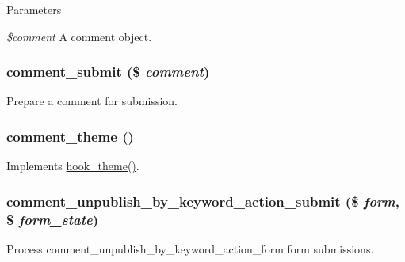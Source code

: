 \begin{DoxyParams}{Parameters}
\item[{\em \$comment}]A comment object. \end{DoxyParams}
\hypertarget{comment_8module_af9a31d3ab86177a7ac7999d049dc0b5f}{
\subsubsection[{comment\_\-submit}]{\setlength{\rightskip}{0pt plus 5cm}comment\_\-submit (\$ {\em comment})}}
\label{comment_8module_af9a31d3ab86177a7ac7999d049dc0b5f}
Prepare a comment for submission. \hypertarget{comment_8module_a55ab29f2d9bfd7b05965e42a9fde98b7}{
\subsubsection[{comment\_\-theme}]{\setlength{\rightskip}{0pt plus 5cm}comment\_\-theme ()}}
\label{comment_8module_a55ab29f2d9bfd7b05965e42a9fde98b7}
Implements \hyperlink{group__hooks_ga013ccb45c7aaab1c16cf9691428c910d}{hook\_\-theme()}. \hypertarget{comment_8module_ad94091cb95aec2dd607bde68a07e0dd1}{
\subsubsection[{comment\_\-unpublish\_\-by\_\-keyword\_\-action\_\-submit}]{\setlength{\rightskip}{0pt plus 5cm}comment\_\-unpublish\_\-by\_\-keyword\_\-action\_\-submit (\$ {\em form}, \/  \$ {\em form\_\-state})}}
\label{comment_8module_ad94091cb95aec2dd607bde68a07e0dd1}
Process comment\_\-unpublish\_\-by\_\-keyword\_\-action\_\-form form submissions.

